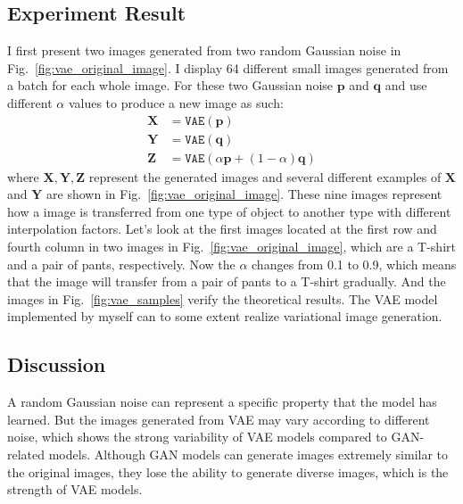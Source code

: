 \subsection{Experiment Result}
I first present two images generated from two random Gaussian noise in Fig.~\ref{fig:vae_original_image}. 
I display 64 different small images generated from a batch for each whole image.
For these two Gaussian noise $\boldsymbol{p}$ and $\boldsymbol{q}$ and use different $\alpha$ values to produce a new image as such:
\begin{align*}
    \mathbf{X}&=\texttt{VAE}(\boldsymbol{p}) \\
    \mathbf{Y}&=\texttt{VAE}(\boldsymbol{q}) \\
    \mathbf{Z}&=\texttt{VAE}(\alpha \boldsymbol{p}+(1-\alpha)\boldsymbol{q})
\end{align*}
where $\mathbf{X,Y,Z}$ represent the generated images and several different examples of $\mathbf{X}$ and $\mathbf{Y}$ are shown in Fig.~\ref{fig:vae_original_image}. 
These nine images represent how a image is transferred from one type of object to another type with different interpolation factors.
Let's look at the first images located at the first row and fourth column in two images in Fig.~\ref{fig:vae_original_image}, which are a T-shirt and a pair of pants, respectively.
Now the $\alpha$ changes from 0.1 to 0.9, which means that the image will transfer from a pair of pants to a T-shirt gradually.
And the images in Fig.~\ref{fig:vae_samples} verify the theoretical results. 
The VAE model implemented by myself can to some extent realize variational image generation.

\subsection{Discussion}
A random Gaussian noise can represent a specific property that the model has learned. But the images generated from VAE may vary according to different noise, which shows the strong variability of VAE models compared to GAN-related models. 
Although GAN models can generate images extremely similar to the original images, they lose the ability to generate diverse images, which is the strength of VAE models.